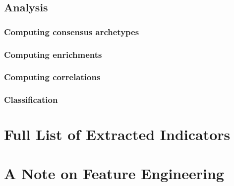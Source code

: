 \documentclass[a4paper]{article}
\begin{document}
	\subsection{Analysis \label{subsec:methods:analysis}}
	

		\subsubsection{Computing consensus archetypes \label{subsec:computingConsensusArchetypes}}
		

		\subsubsection{Computing enrichments \label{subsec:enrichment}}
		

		\subsubsection{Computing correlations \label{subsec:correlations}}
		

		\subsubsection{Classification \label{subsec:classification}}
		


\newpage
\thispagestyle{plain}



\appendix
\newpage
\appendixpage

\noappendicestocpagenum
\addappheadtotoc

\section{Full List of Extracted Indicators \label{app:fullListOfExtractedFeatures}}
\thispagestyle{plain}

\newpage

\section{A Note on Feature Engineering \label{app:aNoteOnFeatureEngineering}}
\thispagestyle{plain}

\newpage
\end{document}
